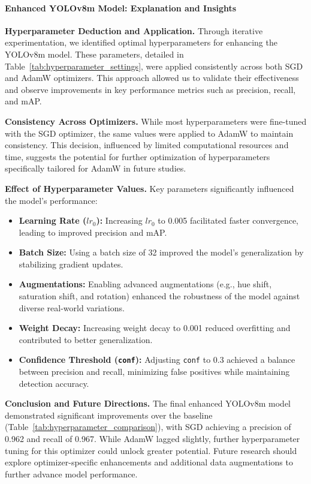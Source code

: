 \documentclass[conference]{IEEEtran}
\begin{document}
\paragraph{Enhanced YOLOv8m Model: Explanation and Insights}

\textbf{Hyperparameter Deduction and Application.} 
Through iterative experimentation, we identified optimal hyperparameters for enhancing the YOLOv8m model. These parameters, detailed in Table~\ref{tab:hyperparameter_settings}, were applied consistently across both SGD and AdamW optimizers. This approach allowed us to validate their effectiveness and observe improvements in key performance metrics such as precision, recall, and mAP.

\textbf{Consistency Across Optimizers.}
While most hyperparameters were fine-tuned with the SGD optimizer, the same values were applied to AdamW to maintain consistency. This decision, influenced by limited computational resources and time, suggests the potential for further optimization of hyperparameters specifically tailored for AdamW in future studies.

\textbf{Effect of Hyperparameter Values.}
Key parameters significantly influenced the model's performance:
\begin{itemize}
    \item \textbf{Learning Rate (\(lr_0\)):} Increasing \(lr_0\) to 0.005 facilitated faster convergence, leading to improved precision and mAP.
    \item \textbf{Batch Size:} Using a batch size of 32 improved the model's generalization by stabilizing gradient updates.
    \item \textbf{Augmentations:} Enabling advanced augmentations (e.g., hue shift, saturation shift, and rotation) enhanced the robustness of the model against diverse real-world variations.
    \item \textbf{Weight Decay:} Increasing weight decay to 0.001 reduced overfitting and contributed to better generalization.
    \item \textbf{Confidence Threshold (\texttt{conf}):} Adjusting \texttt{conf} to 0.3 achieved a balance between precision and recall, minimizing false positives while maintaining detection accuracy.
\end{itemize}

\textbf{Conclusion and Future Directions.}
The final enhanced YOLOv8m model demonstrated significant improvements over the baseline (Table~\ref{tab:hyperparameter_comparison}), with SGD achieving a precision of 0.962 and recall of 0.967. While AdamW lagged slightly, further hyperparameter tuning for this optimizer could unlock greater potential. Future research should explore optimizer-specific enhancements and additional data augmentations to further advance model performance.
\end{document}
